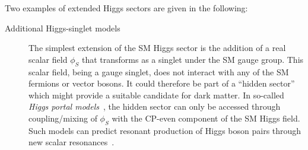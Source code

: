 Two examples of extended Higgs sectors are given in the following:
\begin{description}

\item[Additional Higgs-singlet models] The simplest extension of the SM Higgs
  sector is the addition of a real scalar field $\phi_{S}$ that transforms as a
  singlet under the SM gauge group. This scalar field, being a gauge singlet,
  does not interact with any of the SM fermions or vector bosons. It could
  therefore be part of a ``hidden sector'' which might provide a suitable
  candidate for dark matter. In so-called \emph{Higgs portal
    models}~\cite{Patt:2006fw}, the hidden sector can only be accessed through
  coupling/mixing of $\phi_{S}$ with the CP-even component of the SM Higgs
  field. Such models can predict resonant production of Higgs boson pairs
  through new scalar
  resonances~\cite{Schabinger:2005ei,Bowen:2007ia,Barger:2007im,Dolan:2012ac,No:2013wsa,Chen:2014ask,Robens:2016xkb,DiMicco:2019ngk}.


\end{description}
